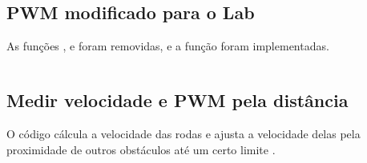 \documentclass{article}
\begin{document}
\subsection*{PWM modificado para o Lab}
As funções ,  e  foram removidas, e a função  foram implementadas.
\inputminted{c}{code/pwm.c}
\newpage

\subsection*{Medir velocidade e PWM pela distância}
O código cálcula a velocidade das rodas e ajusta a velocidade delas pela proximidade de outros obstáculos até um certo limite .
\inputminted{c}{code/main.c}
\end{document}
